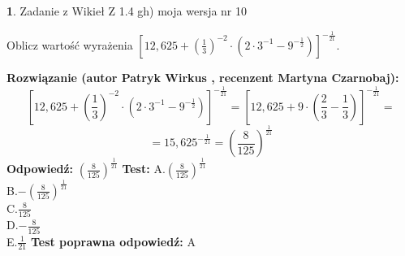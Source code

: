 \documentclass[12pt, a4paper]{article}
\theoremstyle{definition} %
\newtheorem{zad}{}
\newcommand{\zadStart}[1]{\begin{zad}#1\newline}
\newcommand{\zadStop}{\end{zad}}
\newcommand{\rozwStart}[2]{\noindent \textbf{Rozwiązanie (autor #1 , recenzent #2): }\newline}
\newcommand{\rozwStop}{\newline}
\newcommand{\odpStart}{\noindent \textbf{Odpowiedź:}\newline}
\newcommand{\odpStop}{\newline}
\newcommand{\testStart}{\noindent \textbf{Test:}\newline}
\newcommand{\testStop}{\newline}
\newcommand{\kluczStart}{\noindent \textbf{Test poprawna odpowiedź:}\newline}
\newcommand{\kluczStop}{\newline}
\begin{document}
\zadStart{Zadanie z Wikieł Z 1.4 gh) moja wersja nr 10}

Oblicz wartość wyrażenia $[12,625+(\frac{1}{3})^{-2}\cdot(2\cdot 3^{-1} - 9^{-\frac{1}{2}})]^{-\frac{1}{21}}$.
\zadStop
\rozwStart{Patryk Wirkus}{Martyna Czarnobaj}
$$[12,625+(\frac{1}{3})^{-2}\cdot(2\cdot 3^{-1} - 9^{-\frac{1}{2}})]^{-\frac{1}{21}} = [12,625+9\cdot (\frac{2}{3}-\frac{1}{3})]^{-\frac{1}{21}} =$$
$$=15,625^{-\frac{1}{21}} = (\frac{8}{125})^\frac{1}{21}$$
\rozwStop
\odpStart
$(\frac{8}{125})^\frac{1}{21}$
\odpStop
\testStart
A.$(\frac{8}{125})^\frac{1}{21}$\\ B.$-(\frac{8}{125})^\frac{1}{21}$\\ C.$\frac{8}{125}$\\ D.$-\frac{8}{125}$\\ E.$\frac{1}{21}$
\testStop
\kluczStart
A
\kluczStop
\end{document}
